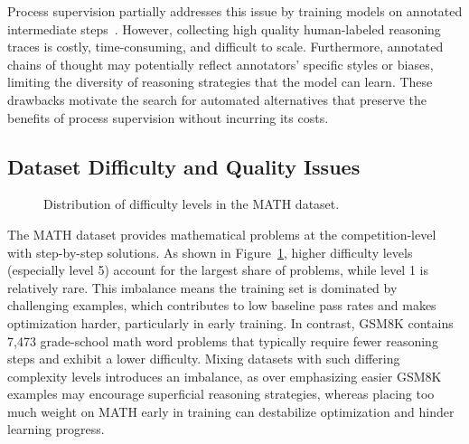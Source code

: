 \documentclass[12pt]{report}
\begin{document}
Process supervision partially addresses this issue by training models on annotated intermediate steps~\cite{uesato2022solvingmathwordproblems, lightman2023letsverifystepstep}. However, collecting high quality human-labeled reasoning traces is costly, time-consuming, and difficult to scale. Furthermore, annotated chains of thought may potentially reflect annotators' specific styles or biases, limiting the diversity of reasoning strategies that the model can learn. These drawbacks motivate the search for automated alternatives that preserve the benefits of process supervision without incurring its costs.

\subsection{Dataset Difficulty and Quality Issues}
\begin{figure}[tbp]
  \centering
  \caption{Distribution of difficulty levels in the MATH dataset.}
  \label{fig:competition_math_difficulty}
\end{figure}

The MATH dataset provides mathematical problems at the competition-level with step-by-step solutions. As shown in Figure~\ref{fig:competition_math_difficulty}, higher difficulty levels (especially level 5) account for the largest share of problems, while level 1 is relatively rare. This imbalance means the training set is dominated by challenging examples, which contributes to low baseline pass rates and makes optimization harder, particularly in early training. In contrast, GSM8K contains 7,473 grade-school math word problems that typically require fewer reasoning steps and exhibit a lower difficulty. Mixing datasets with such differing complexity levels introduces an imbalance, as over emphasizing easier GSM8K examples may encourage superficial reasoning strategies, whereas placing too much weight on MATH early in training can destabilize optimization and hinder learning progress.
\end{document}
